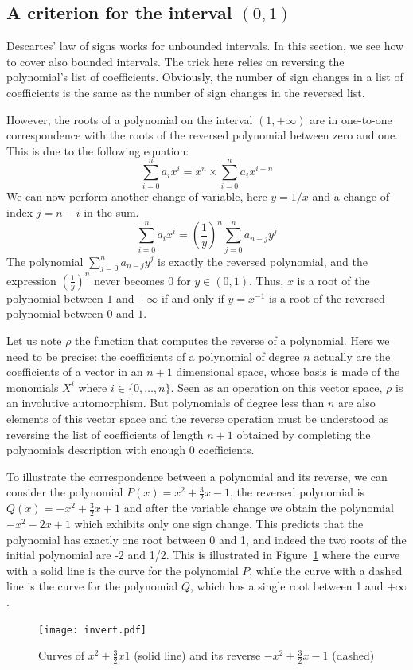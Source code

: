 \documentclass{mscs}
\begin{document}
\subsection{A criterion for the interval \((0,1)\)}
Descartes' law of signs works for unbounded intervals.  In this
section, we see how to cover also bounded intervals. The trick here relies
on reversing the polynomial's list of coefficients.  Obviously, the
number of sign changes in a list of coefficients is the same as the
number of sign changes in the reversed list.

However, the roots of a polynomial on the interval \((1,+\infty)\)
are in one-to-one correspondence with the roots of the
reversed polynomial between zero and one. This is due to the following
equation:
\[\sum_{i=0}^{n}a_i x^i = x^n\times\sum_{i=0}^{n}a_i x^{i-n}\]
We can now perform another change of variable, here \(y=1/x\) and a
change of index \(j=n-i\) in the sum.
\[\sum_{i=0}^{n}a_i x^i = (\frac{1}{y})^n \sum_{j=0}^{n}a_{n-j} y^j\]
The polynomial \(\sum_{j=0}^{n} a_{n-j}y^j\) is exactly the reversed
polynomial, and the expression \((\frac{1}{y})^n\) never becomes 0 for
\(y\in (0,1)\).  Thus, \(x\) is a root of the polynomial between \(1\)
and \(+\infty\) if and only if \(y=x^{-1}\) is a root of the reversed
polynomial between \(0\) and \(1\).

Let us note \(\rho\) the function that computes the reverse of a
polynomial.  Here we need to be precise: the coefficients of a
polynomial of degree \(n\) actually are the coefficients of a vector
in an \(n+1\) dimensional space, whose basis is made of the monomials
\(X^i\) where \(i\in\{0,\dots, n\}\).  Seen as an operation on this vector
space, \(\rho\) is an involutive automorphism.  But
polynomials of degree less than \(n\) are also elements of this vector
space and the reverse operation must be understood as reversing the
list of coefficients of length \(n+1\) obtained by completing the
polynomials description with enough 0 coefficients.


To illustrate the correspondence between a polynomial and its reverse,
we can consider the polynomial \(P(x) = x^2 + \frac{3}{2} x - 1\),
the reversed polynomial is \(Q(x) = -x^2 + \frac{3}{2}x + 1\) and after
the variable change we obtain the polynomial \(-x^2-2x+1\)
which exhibits only one sign change.  This predicts that the polynomial has
exactly one root between 0 and 1, and indeed the two roots of the initial
polynomial are -2 and 1/2.  This is illustrated in
Figure~\ref{invert} where the curve with a solid line is the curve for the
polynomial \(P\), while the curve with a dashed line is the curve for
the polynomial \(Q\), which has a single root between 1 and \(+\infty\).
\begin{figure}
\begin{center}
\texttt{[image: invert.pdf]}
\end{center}
\caption{\label{invert} Curves of \(x^2+\frac{3}{2}x1\) (solid line)
and its reverse \(-x^2 + \frac{3}{2} x - 1\) (dashed)}
\end{figure}
\end{document}
